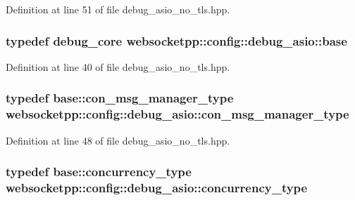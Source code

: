 Definition at line 51 of file debug\+\_\+asio\+\_\+no\+\_\+tls.\+hpp.

\hypertarget{structwebsocketpp_1_1config_1_1debug__asio_ae2b3c4a01c27b2f26bc98419543744cd}{}
\subsubsection[{base}]{\setlength{\rightskip}{0pt plus 5cm}typedef {\bf debug\+\_\+core} {\bf websocketpp\+::config\+::debug\+\_\+asio\+::base}}\label{structwebsocketpp_1_1config_1_1debug__asio_ae2b3c4a01c27b2f26bc98419543744cd}


Definition at line 40 of file debug\+\_\+asio\+\_\+no\+\_\+tls.\+hpp.

\hypertarget{structwebsocketpp_1_1config_1_1debug__asio_a81c47526ef346c02dd630dbb5ed7a81e}{}
\subsubsection[{con\+\_\+msg\+\_\+manager\+\_\+type}]{\setlength{\rightskip}{0pt plus 5cm}typedef {\bf base\+::con\+\_\+msg\+\_\+manager\+\_\+type} {\bf websocketpp\+::config\+::debug\+\_\+asio\+::con\+\_\+msg\+\_\+manager\+\_\+type}}\label{structwebsocketpp_1_1config_1_1debug__asio_a81c47526ef346c02dd630dbb5ed7a81e}


Definition at line 48 of file debug\+\_\+asio\+\_\+no\+\_\+tls.\+hpp.

\hypertarget{structwebsocketpp_1_1config_1_1debug__asio_ad3c746d7e71d7414c054a254418b93d1}{}
\subsubsection[{concurrency\+\_\+type}]{\setlength{\rightskip}{0pt plus 5cm}typedef {\bf base\+::concurrency\+\_\+type} {\bf websocketpp\+::config\+::debug\+\_\+asio\+::concurrency\+\_\+type}}\label{structwebsocketpp_1_1config_1_1debug__asio_ad3c746d7e71d7414c054a254418b93d1}


